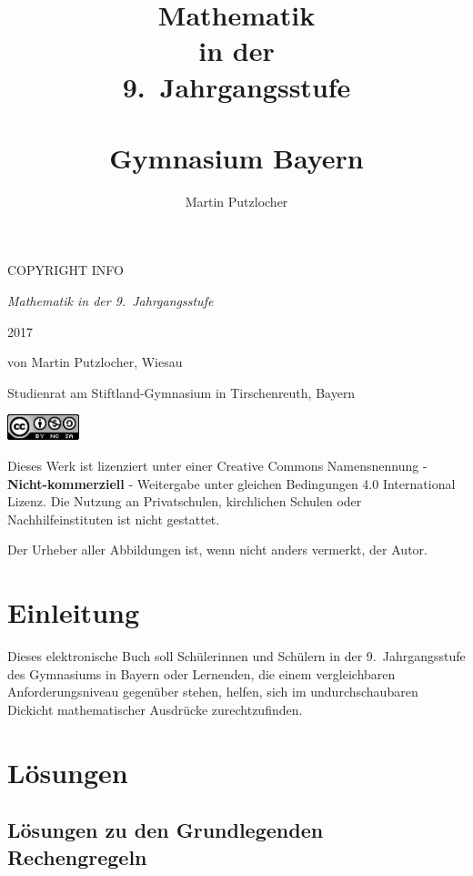 \documentclass[
a6paper, %
11pt, %
onecolumn, %
openany, %
]{memoir}
\author{Martin Putzlocher}
\title{Mathematik\\in der\\9.~Jahrgangsstufe\\~\\{\small Gymnasium Bayern}}
\theoremstyle{break}
\theoremstyle{break}
\theoremstyle{changebreak}
\theoremstyle{nonumberbreak}
\theoremstyle{nonumberplain}
\begin{document}
\frontmatter

\maketitle
\newpage
\null\vfill

\begin{flushleft}
\textcopyright COPYRIGHT INFO

\textit{Mathematik in der 9.~Jahrgangsstufe}

2017

von Martin Putzlocher, Wiesau

Studienrat am Stiftland-Gymnasium in Tirschenreuth, Bayern
\bigskip

 \includegraphics[height=2em]{./cc88x31.png}
 
Dieses Werk ist lizenziert unter einer Creative Commons Namensnennung - \textbf{Nicht-kommerziell} - Weitergabe unter gleichen Bedingungen 4.0 International Lizenz.
Die Nutzung an Privatschulen, kirchlichen Schulen oder Nachhilfeinstituten ist nicht gestattet.

Der Urheber aller Abbildungen ist, wenn nicht anders vermerkt, der Autor.
\end{flushleft}
\clearpage



\tableofcontents*
\clearpage

\chapter{Einleitung}
Dieses elektronische Buch soll Schülerinnen und Schülern in der 9.~Jahrgangsstufe des Gymnasiums in Bayern oder Lernenden, die einem vergleichbaren Anforderungsniveau gegenüber stehen, helfen, sich im undurchschaubaren Dickicht mathematischer Ausdrücke zurechtzufinden.

\mainmatter




\backmatter

\chapter{Lösungen}
\section*{Lösungen zu den Grundlegenden Rechengregeln}
\label{sec:sol1}
\end{document}
